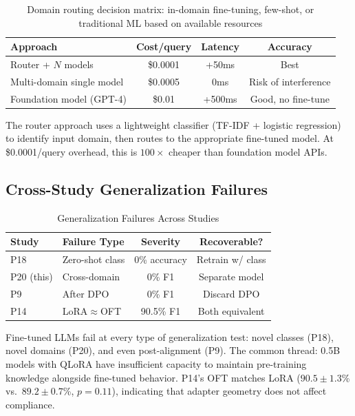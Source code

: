 \documentclass[journal]{IEEEtran}
\begin{document}
\begin{table}[!ht]
\centering
\caption{Domain routing decision matrix: in-domain fine-tuning, few-shot, or traditional ML based on available resources}
\label{tab:routing}
\begin{tabular}{lccc}
\toprule
\textbf{Approach} & \textbf{Cost/query} & \textbf{Latency} & \textbf{Accuracy} \\
\midrule
Router + $N$ models & \$0.0001 & +50ms & Best \\
Multi-domain single model & \$0.0005 & 0ms & Risk of interference \\
Foundation model (GPT-4) & \$0.01 & +500ms & Good, no fine-tune \\
\bottomrule
\end{tabular}
\end{table}

The router approach uses a lightweight classifier (TF-IDF + logistic regression) to identify input domain, then routes to the appropriate fine-tuned model. At \$0.0001/query overhead, this is $100\times$ cheaper than foundation model APIs.

\subsection{Cross-Study Generalization Failures}

\begin{table}[!ht]
\centering
\caption{Generalization Failures Across Studies}
\label{tab:failures}
\begin{tabular}{llcc}
\toprule
\textbf{Study} & \textbf{Failure Type} & \textbf{Severity} & \textbf{Recoverable?} \\
\midrule
P18~\cite{p18} & Zero-shot class & 0\% accuracy & Retrain w/ class \\
P20 (this) & Cross-domain & 0\% F1 & Separate model \\
P9~\cite{p9} & After DPO & 0\% F1 & Discard DPO \\
P14~\cite{p14} & LoRA$\approx$OFT & 90.5\% F1 & Both equivalent \\
\bottomrule
\end{tabular}
\end{table}

Fine-tuned LLMs fail at every type of generalization test: novel classes (P18), novel domains (P20), and even post-alignment (P9). The common thread: 0.5B models with QLoRA have insufficient capacity to maintain pre-training knowledge alongside fine-tuned behavior. P14's OFT matches LoRA ($90.5 \pm 1.3$\% vs.\ $89.2 \pm 0.7$\%, $p = 0.11$), indicating that adapter geometry does not affect compliance.
\end{document}
